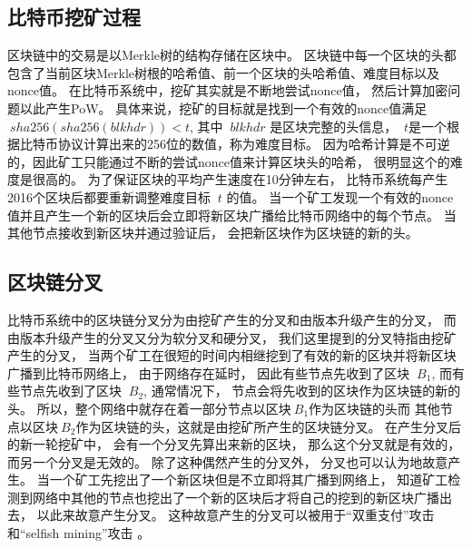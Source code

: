 \documentclass[a4paper, 11pt]{article}
\begin{document}
\begin{CJK*}{UTF8}{gbsn}
    
    \subsection{比特币挖矿过程}

    \indent

    区块链中的交易是以Merkle树\cite{ref_article2}的结构存储在区块中。
    区块链中每一个区块的头都包含了当前区块Merkle树根的哈希值、前一个区块的头哈希值、难度目标以及nonce值。
    在比特币系统中，挖矿其实就是不断地尝试nonce值，
    然后计算加密问题以此产生PoW。
    具体来说，挖矿的目标就是找到一个有效的nonce值满足$\ sha256(sha256(blkhdr)) < t $,
    其中 $\ blkhdr$ 是区块完整的头信息，
    $\ t$是一个根据比特币协议计算出来的256位的数值，称为难度目标。
    因为哈希计算是不可逆的，因此矿工只能通过不断的尝试nonce值来计算区块头的哈希，
    很明显这个的难度是很高的。
    为了保证区块的平均产生速度在10分钟左右，
    比特币系统每产生2016个区块后都要重新调整难度目标 $\ t$ 的值。
    当一个矿工发现一个有效的nonce值并且产生一个新的区块后会立即将新区块广播给比特币网络中的每个节点。
    当其他节点接收到新区块并通过验证后，
    会把新区块作为区块链的新的头。

    \subsection{区块链分叉}

    \indent

    比特币系统中的区块链分叉分为由挖矿产生的分叉\cite{ref_web3}和由版本升级产生的分叉\cite{ref_web4}，
    而由版本升级产生的分叉又分为软分叉和硬分叉，
    我们这里提到的分叉特指由挖矿产生的分叉，
    当两个矿工在很短的时间内相继挖到了有效的新的区块并将新区块广播到比特币网络上，
    由于网络存在延时，
    因此有些节点先收到了区块 $\ B_1$,
    而有些节点先收到了区块 $\ B_2$,
    通常情况下，
    节点会将先收到的区块作为区块链的新的头。
    所以，整个网络中就存在着一部分节点以区块$\ B_1$作为区块链的头而
    其他节点以区块$\ B_2$作为区块链的头，这就是由挖矿所产生的区块链分叉。
    在产生分叉后的新一轮挖矿中，
    会有一个分叉先算出来新的区块，
    那么这个分叉就是有效的，
    而另一个分叉是无效的。
    除了这种偶然产生的分叉外，
    分叉也可以认为地故意产生。
    当一个矿工先挖出了一个新区块但是不立即将其广播到网络上，
    知道矿工检测到网络中其他的节点也挖出了一个新的区块后才将自己的挖到的新区块广播出去，
    以此来故意产生分叉。
    这种故意产生的分叉可以被用于“双重支付”攻击\cite{ref_double_spending}和“selfish mining”攻击
    \cite{ref_selfish_mining1, ref_selfish_mining2, ref_selfish_mining3}。



\end{CJK*}
\end{document}
